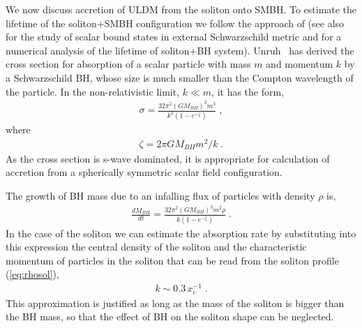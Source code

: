 \documentclass[aps,prd,floats,superscriptaddress,showpacs,nofootinbib,twocolumn,preprintnumbers]{revtex4-1}%
\def\be{\begin{eqnarray}}
\def\ee{\end{eqnarray}}
\begin{document}
\begin{appendix}
We now discuss accretion of ULDM from the
soliton onto SMBH. To estimate the lifetime of the soliton+SMBH
configuration we follow the approach of \cite{Hui:2016ltb} (see also
\cite{Burt:2011pv,Barranco:2012qs} for the study of scalar bound
states in external Schwarzschild metric and \cite{Barranco:2017aes}
for a numerical 
analysis of the lifetime of soliton+BH
system). Unruh~\cite{Unruh:1976fm} has derived the cross section for
absorption of a scalar particle with mass $m$ and momentum $k$ by a
Schwarzschild BH, whose size is much smaller than the 
Compton wavelength of the particle. 
In the non-relativistic limit, $k\ll m$, it has the form,
\be
\sigma=\frac{32\pi^2(GM_{BH})^3m^3}{k^2(1-e^{-\zeta})}\;,
\ee
where 
\be
\zeta=2\pi GM_{BH}m^2/k\;.
\ee
As the cross section is s-wave dominated, it is appropriate for
calculation of accretion from a spherically symmetric scalar field
configuration. 

The
growth of BH mass due to an infalling flux of particles with density
$\rho$ is,
\be
\frac{dM_{BH}}{dt}=\frac{32\pi^2 (GM_{BH})^3m^2\rho}{k(1-e^{-\zeta})}\;.
\ee
In the case of the soliton we can estimate the absorption
rate by substituting into this expression the central density of the
soliton and the characteristic momentum of particles in the soliton
that can be read from the
soliton profile (\ref{eq:rhosol}),
\be
k\sim 0.3\,x_c^{-1}\;.
\ee
This approximation is justified as long as the mass of the soliton is
bigger than the BH mass, so that the effect of BH on the soliton shape
can be neglected. 


\end{appendix}
\end{document}
